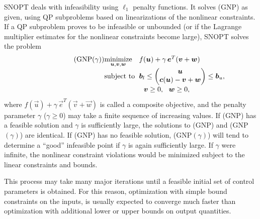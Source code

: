 \documentclass[twocolumn,numbook]{svjour3}          %
\makeatletter
\def\u{{\vec u}}
\def\c{{\vec c}}
\def\w{{\vec w}}
\def\v{{\vec v}}
\def\e{{\vec e}}
\def\b{{\vec b}}
\def\A{{\vec A}}
\def\minim{\mathop{\hbox{\rm minimize}}}
\def\minimize#1{{\displaystyle\minim_{#1}}}
\def\subject{\mbox{\rm subject to}}
\def\strutl{\rule[-1.25ex]{0pt}{3ex}}%
\def\NP#1{NP$(#1)$}
\def\GNP#1{GNP$(#1)$}
\def\SNOPT {{\small SNOPT}}
\def\problem#1#2#3#4{%
   {\begin{tabular*}{0.47\textwidth}
    {@{}l@{\extracolsep{\fill}}l@{\extracolsep{6pt}}l@{\extracolsep{\fill}}c@{}}
      #1 & $\minimize{#2}$ & $#3$ & $ $ \\[5pt]
         & $\subject$      & $#4$ & $ $
    \end{tabular*}}}
\def\newproblem#1#2#3#4#5{%
   {\begin{tabular*}{0.47\textwidth}
    {@{}l@{\extracolsep{\fill}}l@{\extracolsep{6pt}}l@{\extracolsep{\fill}}c@{}}
      #1 & $\minimize{#2}$ & $#3$ & $ $ \\[5pt]
         & $\subject$      & $#4$ & $ $ \\[5pt]
         & & $#5$ & $ $
    \end{tabular*}}}
\newcommand{\pmat}[1]{\begin{pmatrix}#1\end{pmatrix}}
\makeatother
\begin{document}
\SNOPT{} deals with infeasibility using $\ell_1$ penalty functions.
%
%
It solves  (GNP) as given, using QP subproblems
based on linearizations of the nonlinear constraints.
If a QP subproblem proves to be infeasible or unbounded (or if the
Lagrange multiplier estimates for the nonlinear constraints become
large), \SNOPT{} solves the problem
\[
   \newproblem{(\GNP{\gamma})}{\u,\v,\w}{f(\u) + \gamma \, \e^T(\v + \w)}
                 { \b_l \le \pmat{\u\\ \c(\u) - \v + \w \strutl} \le \b_u,}
                 { \ \ \v \ge 0, \ \ \w \ge 0,}
\]
where $f(\u) + \gamma \, \e^T(\v + \w)$ is called a composite objective,
and the penalty parameter $\gamma$ ($\gamma \ge 0$) may take a
finite sequence of increasing values.  
If (GNP) has a feasible solution and $\gamma$ is sufficiently large,
the solutions to (GNP) and (\GNP{\gamma}) are identical.
If (GNP) has no feasible solution, (\GNP{\gamma}) will tend to
determine a ``good'' infeasible point if $\gamma$ is again sufficiently
large.  If $\gamma$ were infinite, the nonlinear constraint violations would
be minimized subject to the linear constraints and bounds.

This process may take many major iterations until a feasible initial set of control parameters
is obtained. For this reason, optimization with simple bound constraints on 
the inputs, is usually expected to converge much faster than optimization with additional lower or upper bounds
on output quantities.
\end{document}
